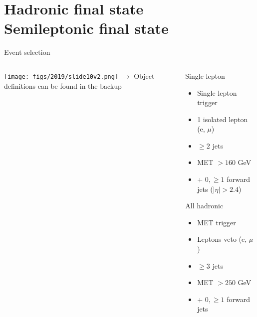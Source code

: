 \documentclass[9pt]{beamer}
\begin{document}
\section{Hadronic final state \\ Semileptonic final state}

\begin{frame}{Event selection}
\justifying
\begin{columns}
		\hspace{5pt}
		\begin{column}{0.64\textwidth}
			\begin{center}
     			\texttt{[image: figs/2019/slide10v2.png]}
     			$\rightarrow$ Object definitions can be found in the backup
    		\end{center}		
		\end{column} \hfill
		\begin{column}{0.39\textwidth}
			\begin{center}
				\begin{block}{\centering Single lepton}\end{block} \vfill
				\begin{itemize}
				\item Single lepton trigger
				\item 1 isolated lepton (e, $\mu$)
				\item $\geq 2$ jets
				\item MET $> 160$ GeV
				\item + $0, \geq 1$ forward jets ($|\eta|> 2.4$)
				\end{itemize} \vfill
				\begin{block}{\centering All hadronic}\end{block} \vfill	
				\begin{itemize}
				\item MET trigger
				\item Leptons veto (e, $\mu$)
				\item $\geq 3$ jets
				\item MET $> 250$ GeV
				\item + $0, \geq 1$ forward jets
				\end{itemize} \vfill
    		\end{center}		
		\end{column} \hfill
\end{columns}
\end{frame}
\end{document}

